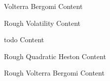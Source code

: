 \documentclass[
	landscape,       %
]{ImperialPoster}
\begin{document}
\begin{multicols}{3}
\begin{multicols}{2}
		\begin{model-section}{Volterra Bergomi}
			Content
		\end{model-section}

		\columnbreak{}

		\begin{description-section}{Rough Volatility}
			Content
		\end{description-section}

		\begin{data-model-section}{todo}
			Content
		\end{data-model-section}

		\begin{model-section}{Rough Quadratic Heston}
			Content
		\end{model-section}

		\begin{model-section}{Rough Volterra Bergomi}
			Content
		\end{model-section}

	\end{multicols}


\end{multicols}
\end{document}
